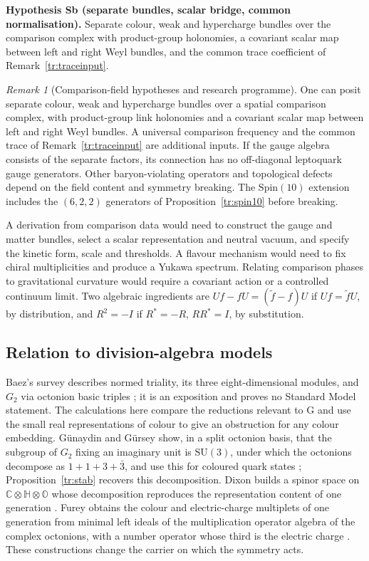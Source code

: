 \documentclass[aps,pra,onecolumn,superscriptaddress,nofootinbib,10pt]{revtex4-2}
\theoremstyle{definition}
\theoremstyle{remark}
\newtheorem{remark}[theorem]{Remark}
\newcommand{\SU}{\mathrm{SU}}
\begin{document}
\smallskip\noindent\textbf{Hypothesis Sb (separate bundles, scalar bridge, common normalisation).}\label{hyp:Sb}  Separate colour, weak and
hypercharge bundles over the comparison complex with product-group holonomies, a covariant scalar map
between left and right Weyl bundles, and the common trace coefficient of Remark~\ref{tr:traceinput}.

\begin{remark}[Comparison-field hypotheses and research programme]\label{tr:programme}
One can posit separate colour, weak and hypercharge bundles over
a spatial comparison complex, with product-group link holonomies
and a covariant scalar map between left and right Weyl bundles.
A universal comparison frequency and the common trace of
Remark~\ref{tr:traceinput} are additional inputs.
If the gauge algebra consists of the separate factors, its
connection has no off-diagonal leptoquark gauge generators.
Other baryon-violating operators and topological defects depend
on the field content and symmetry breaking. The
\(\mathrm{Spin}(10)\) extension includes the \((6,2,2)\)
generators of Proposition~\ref{tr:spin10} before breaking.

A derivation from comparison data would need to construct the
gauge and matter bundles, select a scalar representation and
neutral vacuum, and specify the kinetic form, scale and thresholds.
A flavour mechanism would need to fix chiral multiplicities and
produce a Yukawa spectrum. Relating comparison phases to
gravitational curvature would require a covariant action or a
controlled continuum limit. Two algebraic ingredients are
\(Uf-fU=(\widetilde f-f)U\) if \(Uf=\widetilde fU\), by
distribution, and \(R^2=-I\) if \(R^*=-R\), \(RR^*=I\),
by substitution.
\end{remark}

\subsection{Relation to division-algebra models}\label{tr:literature}

Baez's survey describes normed triality, its three eight-dimensional
modules, and \(G_2\) via octonion basic triples
\cite[\S\S2.4, 4.1]{Baez}; it is an exposition and proves no Standard Model statement. The calculations here compare the
reductions relevant to G and use the small real representations
of colour to give an obstruction for any colour embedding.
G\"unaydin and G\"ursey show, in a split octonion basis, that the subgroup of $G_2$ fixing an imaginary unit
is $\SU(3)$, under which the octonions decompose as $1+1+3+\bar3$, and use this for coloured quark states
\cite{GG}; Proposition~\ref{tr:stab} recovers this decomposition. Dixon builds a spinor space on
\(\mathbb C\otimes\mathbb H\otimes\mathbb O\) whose decomposition reproduces the representation content of one
generation \cite{Dixon}.
Furey obtains the colour and electric-charge multiplets of one generation from
minimal left ideals of the multiplication operator algebra of
the complex octonions, with a number operator whose third is the electric charge
\cite{tr:FureyCharge}. These constructions change the carrier on
which the symmetry acts.
\end{document}
